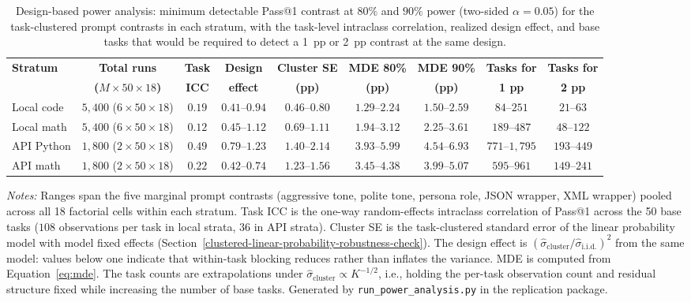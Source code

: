 \documentclass[a4paper,fleqn]{cas-sc}
\begin{document}
\begin{table}[htbp]
\centering
\caption{Design-based power analysis: minimum detectable Pass@1 contrast at $80\%$ and $90\%$ power (two-sided $\alpha = 0.05$) for the task-clustered prompt contrasts in each stratum, with the task-level intraclass correlation, realized design effect, and base tasks that would be required to detect a 1~pp or 2~pp contrast at the same design.}\label{tab:power-analysis}
\footnotesize
\setlength{\tabcolsep}{4pt}
\begin{tabular}{@{}lcccccccc@{}}
\toprule
\textbf{Stratum} & \textbf{Total runs} & \textbf{Task} & \textbf{Design} & \textbf{Cluster SE} & \textbf{MDE 80\%} & \textbf{MDE 90\%} & \textbf{Tasks for} & \textbf{Tasks for} \\
 & \textbf{($M \times 50 \times 18$)} & \textbf{ICC} & \textbf{effect} & \textbf{(pp)} & \textbf{(pp)} & \textbf{(pp)} & \textbf{1 pp} & \textbf{2 pp} \\
\midrule
Local code & $5{,}400$ ($6 \times 50 \times 18$) & $0.19$ & $0.41$--$0.94$ & $0.46$--$0.80$ & $1.29$--$2.24$ & $1.50$--$2.59$ & $84$--$251$ & $21$--$63$ \\
Local math & $5{,}400$ ($6 \times 50 \times 18$) & $0.12$ & $0.45$--$1.12$ & $0.69$--$1.11$ & $1.94$--$3.12$ & $2.25$--$3.61$ & $189$--$487$ & $48$--$122$ \\
API Python & $1{,}800$ ($2 \times 50 \times 18$) & $0.49$ & $0.79$--$1.23$ & $1.40$--$2.14$ & $3.93$--$5.99$ & $4.54$--$6.93$ & $771$--$1{,}795$ & $193$--$449$ \\
API math & $1{,}800$ ($2 \times 50 \times 18$) & $0.22$ & $0.42$--$0.74$ & $1.23$--$1.56$ & $3.45$--$4.38$ & $3.99$--$5.07$ & $595$--$961$ & $149$--$241$ \\
\bottomrule
\end{tabular}

\vspace{2pt}
\begin{minipage}{\linewidth}
\footnotesize
\textit{Notes:} Ranges span the five marginal prompt contrasts (aggressive tone, polite tone, persona role, JSON wrapper, XML wrapper) pooled across all 18 factorial cells within each stratum. Task ICC is the one-way random-effects intraclass correlation of Pass@1 across the 50 base tasks ($108$ observations per task in local strata, $36$ in API strata). Cluster SE is the task-clustered standard error of the linear probability model with model fixed effects (Section~\ref{clustered-linear-probability-robustness-check}). The design effect is $(\hat{\sigma}_{\text{cluster}} / \hat{\sigma}_{\text{i.i.d.}})^2$ from the same model: values below one indicate that within-task blocking reduces rather than inflates the variance. MDE is computed from Equation~\ref{eq:mde}. The task counts are extrapolations under $\hat{\sigma}_{\text{cluster}} \propto K^{-1/2}$, i.e., holding the per-task observation count and residual structure fixed while increasing the number of base tasks. Generated by \texttt{run\_power\_analysis.py} in the replication package.
\end{minipage}
\end{table}
\end{document}
